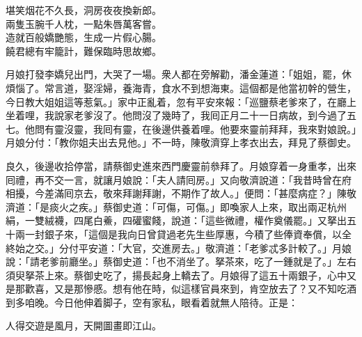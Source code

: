 \begin{myquote}
堪笑烟花不久長，洞房夜夜換新郎。\\兩隻玉腕千人枕，一點朱唇萬客嘗。\\造就百般嬌艷態，生成一片假心腸。\\饒君總有牢籠計，難保臨時思故鄉。
\end{myquote}

月娘打發李嬌兒出門，大哭了一場。衆人都在旁解勸，潘金蓮道：「姐姐，罷，休煩惱了。常言道，娶淫婦，養海青，食水不到想海東。這個都是他當初幹的營生，今日教大姐姐這等惹氣。」家中正亂着，忽有平安來報：「巡鹽蔡老爹來了，在廳上坐着哩，我說家老爹沒了。他問沒了幾時了，我囘正月二十一日病故，到今過了五七。他問有靈沒靈，我囘有靈，在後邊供養着哩。他要來靈前拜拜，我來對娘說。」月娘分付：「教你姐夫出去見他。」不一時，陳敬濟穿上孝衣出去，拜見了蔡御史。

良久，後邊收拾停當，請蔡御史進來西門慶靈前叅拜了。月娘穿着一身重孝，出來囘禮，再不交一言，就讓月娘說：「夫人請囘房。」又向敬濟說道：「我昔時曾在府相擾，今差滿囘京去，敬來拜謝拜謝，不期作了故人。」便問：「甚麼病症？」陳敬濟道：「是痰火之疾。」蔡御史道：「可傷，可傷。」即喚家人上來，取出兩疋杭州絹，一雙絨襪，四尾白鯗，四礶蜜餞，說道：「這些微禮，權作奠儀罷。」又拏出五十兩一封銀子來，「這個是我向日曾貸過老先生些厚惠，今積了些俸資奉償，以全終始之交。」{}分付平安道：「大官，交進房去。」敬濟道：「老爹忒多計較了。」月娘說：「請老爹前廳坐。」蔡御史道：「也不消坐了。拏茶來，吃了一鍾就是了。」左右須臾拏茶上來。蔡御史吃了，揚長起身上轎去了。月娘得了這五十兩銀子，心中又是那歡喜，又是那慘慼。想有他在時，似這樣官員來到，肯空放去了？又不知吃酒到多咱晚。今日他伸着脚子，空有家私，眼看着就無人陪待。正是：

\begin{myquote}
人得交遊是風月，天開圖畫即江山。
\end{myquote}

